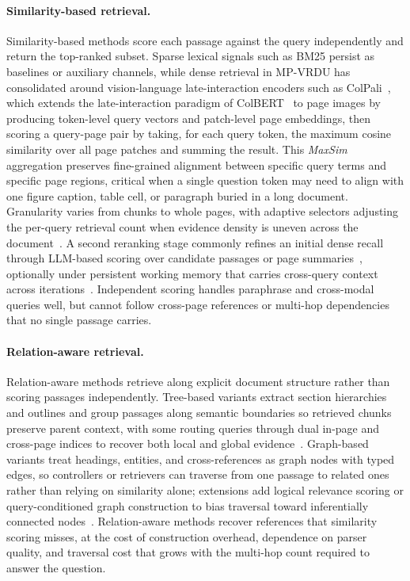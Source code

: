 \documentclass[11pt]{article}
\begin{document}
\paragraph{Similarity-based retrieval.} Similarity-based methods score each passage against the query independently and return the top-ranked subset. Sparse lexical signals such as BM25 persist as baselines or auxiliary channels, while dense retrieval in MP-VRDU has consolidated around vision-language late-interaction encoders such as ColPali~\cite{faysse2024colpali}, which extends the late-interaction paradigm of ColBERT~\cite{khattab2020colbert} to page images by producing token-level query vectors and patch-level page embeddings, then scoring a query-page pair by taking, for each query token, the maximum cosine similarity over all page patches and summing the result. This \emph{MaxSim} aggregation preserves fine-grained alignment between specific query terms and specific page regions, critical when a single question token may need to align with one figure caption, table cell, or paragraph buried in a long document. Granularity varies from chunks to whole pages, with adaptive selectors adjusting the per-query retrieval count when evidence density is uneven across the document~\cite{li2025avir}. A second reranking stage commonly refines an initial dense recall through LLM-based scoring over candidate passages or page summaries~\cite{zhang2024cream,jain2025simpledoc}, optionally under persistent working memory that carries cross-query context across iterations~\cite{jain2025simpledoc}. Independent scoring handles paraphrase and cross-modal queries well, but cannot follow cross-page references or multi-hop dependencies that no single passage carries.

\paragraph{Relation-aware retrieval.} Relation-aware methods retrieve along explicit document structure rather than scoring passages independently. Tree-based variants extract section hierarchies and outlines and group passages along semantic boundaries so retrieved chunks preserve parent context, with some routing queries through dual in-page and cross-page indices to recover both local and global evidence~\cite{shin2025multidocfusion,sun2025docagent,gong2025mhierrag}. Graph-based variants treat headings, entities, and cross-references as graph nodes with typed edges, so controllers or retrievers can traverse from one passage to related ones rather than relying on similarity alone; extensions add logical relevance scoring or query-conditioned graph construction to bias traversal toward inferentially connected nodes~\cite{wang2024knowledge,wu2025molorag,zhang2026mldocrag}. Relation-aware methods recover references that similarity scoring misses, at the cost of construction overhead, dependence on parser quality, and traversal cost that grows with the multi-hop count required to answer the question.
\end{document}
